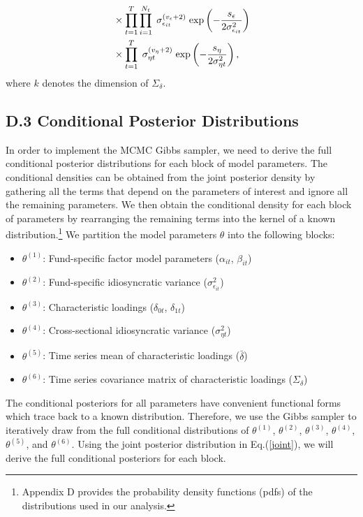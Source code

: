 \begin{alignat}{2}
  &\times \prod^{T}_{t=1}\prod^{N_t}_{i=1} \hspace{0.1cm} \sigma_{\epsilon_{it}}^{(v_\epsilon+2)}\hspace{0.1cm}\text{exp}\left(-\frac{s_\epsilon}{2\sigma^2_{\epsilon_{it}}}\right) \nonumber \\  
  &\times \prod^{T}_{t=1}\hspace{0.1cm}\sigma_{\eta t}^{(v_\eta + 2)}\hspace{0.1cm}\text{exp}\left(-\frac{s_\eta}{2\sigma^2_{\eta t}}\right),
\end{alignat} 
where $k$ denotes the dimension of $\Sigma_\delta$. 
 
 \subsection*{D.3 \hspace{0.1cm} Conditional Posterior Distributions}
In order to implement the MCMC Gibbs sampler, we need to derive the full conditional posterior distributions for each block of model parameters. The conditional densities can be obtained from the joint posterior density by gathering all the terms that depend on the parameters of interest and ignore all the remaining parameters. We then obtain the conditional density for each block of parameters by rearranging the remaining terms into the kernel of a known distribution.\footnote{Appendix D provides the probability density functions (pdfs) of the distributions used in our analysis.} We partition the model parameters $\theta$ into the following blocks: 
\begin{itemize}
    \item $\theta^{(1)}$: Fund-specific factor model parameters ($\alpha_{it}$, $\beta_{it}$)
    \item $\theta^{(2)}$: Fund-specific idiosyncratic variance ($\sigma^2_{\epsilon_{it}}$)
    \item $\theta^{(3)}$:  Characteristic loadings ($\delta_{0t}$, $\delta_{1t}$)
    \item $\theta^{(4)}$: Cross-sectional idiosyncratic variance ($\sigma^2_{\eta t}$)
        \item $\theta^{(5)}$: Time series mean of characteristic loadings ($\bar{\delta}$)
    \item $\theta^{(6)}$: Time series covariance matrix of  characteristic loadings ($\Sigma_{\delta}$)

\end{itemize}
\par The conditional posteriors for all parameters have convenient functional forms which trace back to a known distribution. Therefore, we use the Gibbs sampler to iteratively draw from the full conditional distributions of $\theta^{(1)}$, $\theta^{(2)}$, $\theta^{(3)}$, $\theta^{(4)}$, $\theta^{(5)}$, and $\theta^{(6)}$. Using the joint posterior distribution in Eq.(\ref{joint}), we will derive the full conditional posteriors for each block. 

